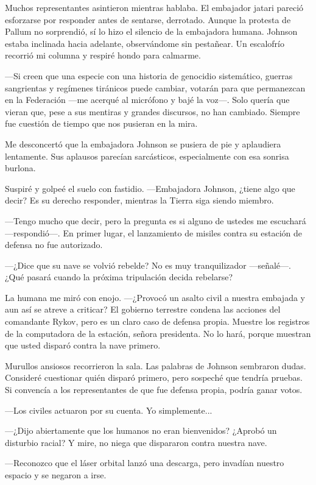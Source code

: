 Muchos representantes asintieron mientras hablaba. El embajador jatari pareció esforzarse por responder antes de sentarse, derrotado. Aunque la protesta de Pallum no sorprendió, sí lo hizo el silencio de la embajadora humana. Johnson estaba inclinada hacia adelante, observándome sin pestañear. Un escalofrío recorrió mi columna y respiré hondo para calmarme.

—Si creen que una especie con una historia de genocidio sistemático, guerras sangrientas y regímenes tiránicos puede cambiar, votarán para que permanezcan en la Federación —me acerqué al micrófono y bajé la voz—. Solo quería que vieran que, pese a sus mentiras y grandes discursos, no han cambiado. Siempre fue cuestión de tiempo que nos pusieran en la mira.

Me desconcertó que la embajadora Johnson se pusiera de pie y aplaudiera lentamente. Sus aplausos parecían sarcásticos, especialmente con esa sonrisa burlona.

Suspiré y golpeé el suelo con fastidio. —Embajadora Johnson, ¿tiene algo que decir? Es su derecho responder, mientras la Tierra siga siendo miembro.

—Tengo mucho que decir, pero la pregunta es si alguno de ustedes me escuchará —respondió—. En primer lugar, el lanzamiento de misiles contra su estación de defensa no fue autorizado.

 —¿Dice que su nave se volvió rebelde? No es muy tranquilizador —señalé—. ¿Qué pasará cuando la próxima tripulación decida rebelarse?

La humana me miró con enojo. —¿Provocó un asalto civil a nuestra embajada y aun así se atreve a criticar? El gobierno terrestre condena las acciones del comandante Rykov, pero es un claro caso de defensa propia. Muestre los registros de la computadora de la estación, señora presidenta. No lo hará, porque muestran que usted disparó contra la nave primero.

Murullos ansiosos recorrieron la sala. Las palabras de Johnson sembraron dudas. Consideré cuestionar quién disparó primero, pero sospeché que tendría pruebas. Si convencía a los representantes de que fue defensa propia, podría ganar votos.

—Los civiles actuaron por su cuenta. Yo simplemente...

 —¿Dijo abiertamente que los humanos no eran bienvenidos? ¿Aprobó un disturbio racial? Y mire, no niega que dispararon contra nuestra nave.

—Reconozco que el láser orbital lanzó una descarga, pero invadían nuestro espacio y se negaron a irse.

